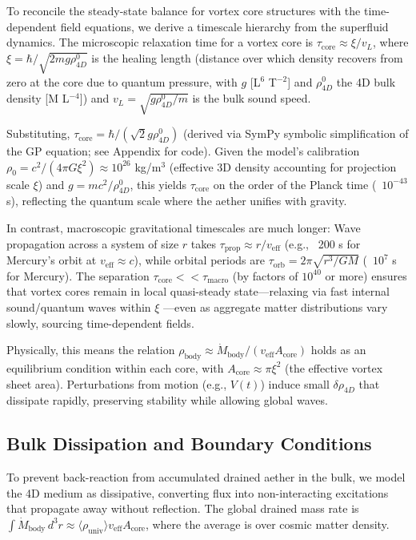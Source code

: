 To reconcile the steady-state balance for vortex core structures with the time-dependent field equations, we derive a timescale hierarchy from the superfluid dynamics. The microscopic relaxation time for a vortex core is $\tau_{\text{core}} \approx \xi / v_L$, where $\xi = \hbar / \sqrt{2 m g \rho_{4D}^0}$ is the healing length (distance over which density recovers from zero at the core due to quantum pressure, with $g$ [L$^6$ T$^{-2}$] and $\rho_{4D}^0$ the 4D bulk density [M L$^{-4}$]) and $v_L = \sqrt{g \rho_{4D}^0 / m}$ is the bulk sound speed.

Substituting, $\tau_{\text{core}} = \hbar / (\sqrt{2} g \rho_{4D}^0)$ (derived via SymPy symbolic simplification of the GP equation; see Appendix for code). Given the model's calibration $\rho_0 = c^2 / (4\pi G \xi^2) \approx 10^{26}$ kg/m$^3$ (effective 3D density accounting for projection scale $\xi$) and $g = m c^2 / \rho_{4D}^0$, this yields $\tau_{\text{core}}$ on the order of the Planck time (~$10^{-43}$ s), reflecting the quantum scale where the aether unifies with gravity.

In contrast, macroscopic gravitational timescales are much longer: Wave propagation across a system of size $r$ takes $\tau_{\text{prop}} \approx r / v_{\text{eff}}$ (e.g., ~200 s for Mercury's orbit at $v_{\text{eff}} \approx c$), while orbital periods are $\tau_{\text{orb}} = 2\pi \sqrt{r^3 / G M}$ (~$10^{7}$ s for Mercury). The separation $\tau_{\text{core}} << \tau_{\text{macro}}$ (by factors of $10^{40}$ or more) ensures that vortex cores remain in local quasi-steady state---relaxing via fast internal sound/quantum waves within $\xi$ ---even as aggregate matter distributions vary slowly, sourcing time-dependent fields.

Physically, this means the relation $\rho_{\text{body}} \approx \dot{M}_{\text{body}} / (v_{\text{eff}} A_{\text{core}})$ holds as an equilibrium condition within each core, with $A_{\text{core}} \approx \pi \xi^2$ (the effective vortex sheet area). Perturbations from motion (e.g., $V(t)$) induce small $\delta \rho_{4D}$ that dissipate rapidly, preserving stability while allowing global waves.

\subsection{Bulk Dissipation and Boundary Conditions}

To prevent back-reaction from accumulated drained aether in the bulk, we model the 4D medium as dissipative, converting flux into non-interacting excitations that propagate away without reflection. The global drained mass rate is $\int \dot{M}_{\text{body}} \, d^3 r \approx \langle \rho_{\text{univ}} \rangle v_{\text{eff}} A_{\text{core}}$, where the average is over cosmic matter density.

